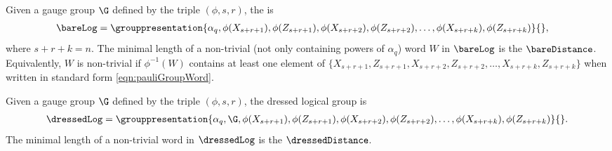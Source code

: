 \begin{definition}
	Given a gauge group $\G$ defined by the triple $(\phi,s,r)$, the  is
	\begin{align}
		\bareLog & = \grouppresentation{\alpha_{q},\phi(X_{s+r+1}),\phi(Z_{s+r+1}),\phi(X_{s+r+2}),\phi(Z_{s+r+2}),\ldots,\phi(X_{s+r+k}),\phi(Z_{s+r+k})}{},
	\end{align}
	where $s+r+k=n$.
	The minimal length of a non-trivial (not only containing powers of $\alpha_{q}$) word $W$ in $\bareLog$ is the  $\bareDistance$.
	Equivalently, $W$ is non-trivial if $\phi^{-1}(W)$ contains at least one element of $\{X_{s+r+1},Z_{s+r+1},X_{s+r+2},Z_{s+r+2},\ldots,X_{s+r+k},Z_{s+r+k}\}$ when written in standard form \cref{eqn:pauliGroupWord}.
\end{definition}

\begin{definition}
	Given a gauge group $\G$ defined by the triple $(\phi,s,r)$, the dressed logical group is
	\begin{align}
		\dressedLog = \grouppresentation{\alpha_{q},\G,\phi(X_{s+r+1}),\phi(Z_{s+r+1}),\phi(X_{s+r+2}),\phi(Z_{s+r+2}),\ldots,\phi(X_{s+r+k}),\phi(Z_{s+r+k})}{}.
	\end{align}
	The minimal length of a non-trivial word in $\dressedLog$ is the  $\dressedDistance$.
\end{definition}

